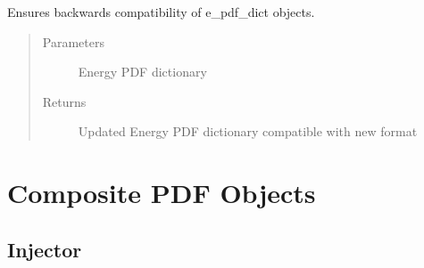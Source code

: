 \documentclass[letterpaper,10pt,english]{sphinxmanual}
\begin{document}

\begin{fulllineitems}
Ensures backwards compatibility of e\_pdf\_dict objects.
\begin{quote}\begin{description}
\item[{Parameters}] \leavevmode
{} \textendash{} Energy PDF dictionary

\item[{Returns}] \leavevmode
Updated Energy PDF dictionary compatible with new format

\end{description}\end{quote}

\end{fulllineitems}



\chapter{Composite PDF Objects}
\label{\detokenize{index:composite-pdf-objects}}

\section{Injector}
\label{\detokenize{index:module-flarestack.core.injector}}\label{\detokenize{index:injector}}
\end{document}
